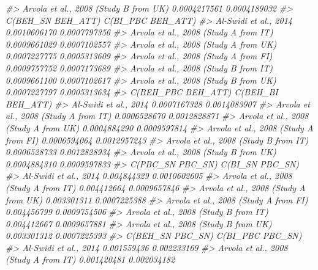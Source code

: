 \documentclass[
]{book}
\newenvironment{Shaded}{\begin{snugshade}}{\end{snugshade}}
\newcommand{\CommentTok}[1]{\textcolor[rgb]{0.56,0.35,0.01}{\textit{#1}}}
\begin{document}
\begin{Shaded}
\begin{Highlighting}[]
\CommentTok{\#\textgreater{} Arvola et al., 2008 (Study B from UK)      0.0004217561     0.0004189032}
\CommentTok{\#\textgreater{}                                       C(BEH\_SN BEH\_ATT) C(BI\_PBC BEH\_ATT)}
\CommentTok{\#\textgreater{} Al{-}Swidi et al., 2014                      0.0010606170      0.0007797356}
\CommentTok{\#\textgreater{} Arvola et al., 2008 (Study A from IT)      0.0009661029      0.0007102557}
\CommentTok{\#\textgreater{} Arvola et al., 2008 (Study A from UK)      0.0007227775      0.0005313609}
\CommentTok{\#\textgreater{} Arvola et al., 2008 (Study A from FI)      0.0009757752      0.0007173689}
\CommentTok{\#\textgreater{} Arvola et al., 2008 (Study B from IT)      0.0009661100      0.0007102617}
\CommentTok{\#\textgreater{} Arvola et al., 2008 (Study B from UK)      0.0007227797      0.0005313634}
\CommentTok{\#\textgreater{}                                       C(BEH\_PBC BEH\_ATT) C(BEH\_BI BEH\_ATT)}
\CommentTok{\#\textgreater{} Al{-}Swidi et al., 2014                       0.0007167328      0.0014083907}
\CommentTok{\#\textgreater{} Arvola et al., 2008 (Study A from IT)       0.0006528670      0.0012828871}
\CommentTok{\#\textgreater{} Arvola et al., 2008 (Study A from UK)       0.0004884290      0.0009597814}
\CommentTok{\#\textgreater{} Arvola et al., 2008 (Study A from FI)       0.0006594064      0.0012957243}
\CommentTok{\#\textgreater{} Arvola et al., 2008 (Study B from IT)       0.0006528733      0.0012828934}
\CommentTok{\#\textgreater{} Arvola et al., 2008 (Study B from UK)       0.0004884310      0.0009597833}
\CommentTok{\#\textgreater{}                                       C(PBC\_SN PBC\_SN) C(BI\_SN PBC\_SN)}
\CommentTok{\#\textgreater{} Al{-}Swidi et al., 2014                      0.004844329    0.0010602605}
\CommentTok{\#\textgreater{} Arvola et al., 2008 (Study A from IT)      0.004412664    0.0009657846}
\CommentTok{\#\textgreater{} Arvola et al., 2008 (Study A from UK)      0.003301311    0.0007225388}
\CommentTok{\#\textgreater{} Arvola et al., 2008 (Study A from FI)      0.004456799    0.0009754506}
\CommentTok{\#\textgreater{} Arvola et al., 2008 (Study B from IT)      0.004412667    0.0009657881}
\CommentTok{\#\textgreater{} Arvola et al., 2008 (Study B from UK)      0.003301312    0.0007225393}
\CommentTok{\#\textgreater{}                                       C(BEH\_SN PBC\_SN) C(BI\_PBC PBC\_SN)}
\CommentTok{\#\textgreater{} Al{-}Swidi et al., 2014                      0.001559436      0.002233169}
\CommentTok{\#\textgreater{} Arvola et al., 2008 (Study A from IT)      0.001420481      0.002034182}

\end{Highlighting}
\end{Shaded}
\end{document}
